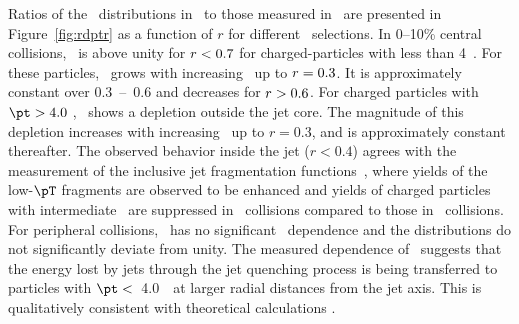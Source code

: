 

Ratios of the \Dptr\ distributions in \pbpb\ to those measured in \pp\ are presented in Figure~\ref{fig:rdptr} as a function of $r$ for different \pt\ selections. In 0--10\% central collisions, 
\RDptr\ is above unity for $\mbox{$r$} < 0.7$ for charged-particles with \pT less than 4~\GeV. 
For these particles, 
\RDptr\ grows with increasing \rvar\ up to \mbox{$\mbox{$r$}  = 0.3$}. It is approximately constant over \mbox{0.3 -- 0.6} and decreases for \mbox{$\mbox{$r$} > 0.6$}.  For charged particles with $\pt > 4.0$ \GeV, \RDptr\ shows a depletion outside the jet core. The magnitude of this depletion increases with increasing \rvar\ up to $r = 0.3$, and is approximately constant thereafter.
 The observed behavior inside the jet ($r < 0.4$) agrees with the measurement of the inclusive jet fragmentation functions~\cite{Aaboud:2017eww, PhysRevC.98.024908}, where yields of the low-$\pT$ fragments are observed to be enhanced and yields of charged particles with intermediate \pT\ are suppressed in \PbPb\ collisions compared to those in \pp\ collisions. 
For peripheral collisions, \RDptr\ has no significant \rvar\ dependence and the distributions do not significantly deviate from unity. 
The measured dependence of \RDptr\ suggests that the energy lost by jets through the jet quenching process is being transferred to particles with $\pt <$~4.0~\GeV\ at larger radial distances from the jet axis. This is qualitatively consistent with theoretical calculations \mbox{\cite{Qin:2015srf,Blaizot:2014ula}}.

